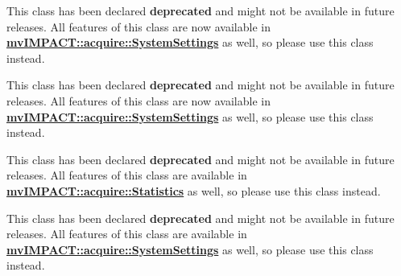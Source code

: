 \begin{DoxyRefList}
This class has been declared {\bfseries deprecated} and might not be available in future releases. All features of this class are now available in {\bfseries \hyperlink{classmv_i_m_p_a_c_t_1_1acquire_1_1_system_settings}{mv\+I\+M\+P\+A\+C\+T\+::acquire\+::\+System\+Settings}} as well, so please use this class instead.

This class has been declared {\bfseries deprecated} and might not be available in future releases. All features of this class are now available in {\bfseries \hyperlink{classmv_i_m_p_a_c_t_1_1acquire_1_1_system_settings}{mv\+I\+M\+P\+A\+C\+T\+::acquire\+::\+System\+Settings}} as well, so please use this class instead.

This class has been declared {\bfseries deprecated} and might not be available in future releases. All features of this class are available in {\bfseries \hyperlink{classmv_i_m_p_a_c_t_1_1acquire_1_1_statistics}{mv\+I\+M\+P\+A\+C\+T\+::acquire\+::\+Statistics}} as well, so please use this class instead. 

This class has been declared {\bfseries deprecated} and might not be available in future releases. All features of this class are available in {\bfseries \hyperlink{classmv_i_m_p_a_c_t_1_1acquire_1_1_system_settings}{mv\+I\+M\+P\+A\+C\+T\+::acquire\+::\+System\+Settings}} as well, so please use this class instead. 


\end{DoxyRefList}
